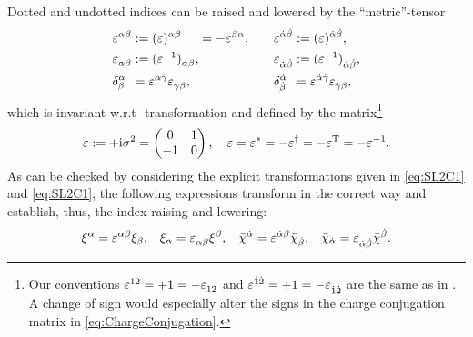 Dotted and undotted indices can be raised and lowered by the \enquote{metric}-tensor
\begin{equation}
	\begin{alignedat}{5}
		&\tensor{\eps}{^{\alpha \beta}} &&:= \tensor{(\eps)}{^{\alpha \beta}} && = - \tensor{\eps}{^{\beta \alpha}}
		\text{,} \quad && \quad
		\tensor{\eps}{^{\dot{\alpha} \dot{\beta}}} &&:= \tensor{(\eps)}{^{\dot{\alpha} \dot{\beta}}}
		\text{,} \\
%		
		&\tensor{\eps}{_{\alpha \beta}} &&:= \tensor{(\eps^{-1})}{_{\alpha \beta}}
		\text{,} &&\quad &&
		\quad \tensor{\eps}{_{\dot{\alpha} \dot{\beta}}} &&:= \tensor{(\eps^{-1})}{_{\dot{\alpha} \dot{\beta}}}
		\text{,} \\
%
		&\tensor*{\delta}{^{\alpha} _{\beta}} &&= \tensor{\eps}{^{\alpha \gamma}} \tensor{\eps}{_{\gamma \beta}}
		\text{,} && \quad && \quad
		\tensor*{\delta}{^{\dot{\alpha}} _{\dot{\beta}}} &&= \tensor{\eps}{^{\dot{\alpha} \dot{\gamma}}} \tensor{\eps}{_{\dot{\gamma} \beta}}
		\text{,}
	\end{alignedat} \label{eq:SL2Cepsilon}
\end{equation}
which is invariant w.r.t \SLtwoC-transformation and defined by the matrix\footnote{Our conventions $ \tensor{\eps}{^{12}}= +1 = -\tensor{\eps}{_{12}} $ and $ \tensor{\eps}{^{\dot{1} \dot{2}}}= +1 = -\tensor{\eps}{_{\dot{1} \dot{2}}} $ are the same as in . A change of sign would especially alter the signs in the charge conjugation matrix in \cref{eq:ChargeConjugation}.}
\begin{equation}
	\begin{aligned}
		\varepsilon := + \mathrm{i} \sigma^{2} = \begin{pmatrix}
			0 & 1 \\
			-1 & 0 
		\end{pmatrix}
		, \quad
		\varepsilon = \varepsilon^{*} = - \varepsilon^{\dagger} = -\varepsilon^{\mathrm{T}} = -\varepsilon^{-1}.
	\end{aligned}
\end{equation}
As can be checked by considering the explicit transformations given in \cref{eq:SL2C1} and \eqref{eq:SL2C1}, the following expressions transform in the correct way and establish, thus, the index raising and lowering: 
\begin{equation}
	\begin{aligned}
		\xi^{\alpha} = \tensor{\eps}{^{\alpha \beta}} \xi_{\beta}
		\text{,} \quad
		\xi_{\alpha} = \tensor{\eps}{_{\alpha \beta}} \xi^{\beta}
		\text{,} \quad
		\bar{\chi}^{\dot{\alpha}} = \tensor{\eps}{^{\dot{\alpha} \dot{\beta}}} \bar{\chi}_{\dot{\beta}}
		\text{,} \quad
		\bar{\chi}_{\dot{\alpha}} = \tensor{\eps}{_{\dot{\alpha} \dot{\beta}}} \bar{\chi}^{\dot{\beta}}
		\text{.}
	\end{aligned} \label{eq:raisingANDlowringSL2C}
\end{equation}
